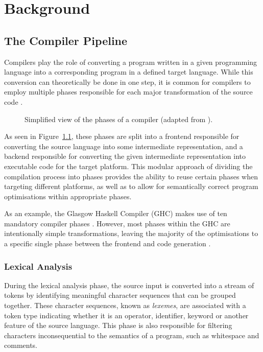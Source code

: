 \chapter{Background}
\label{ch:background}

\section{The Compiler Pipeline}

Compilers play the role of converting a program written in a given programming language into a
corresponding program in a defined target language. While this conversion can theoretically be done
in one step, it is common for compilers to employ multiple phases responsible for each major
transformation of the source code \autocite{grune2012modern}.

\begin{figure}
    \centering
    
    \caption{Simplified view of the phases of a compiler (adapted from \autocite{grune2012modern}).}
    \label{fig:compiler-pipeline}
\end{figure}

As seen in Figure~\ref{fig:compiler-pipeline}, these phases are split into a frontend responsible
for converting the source language into some intermediate representation, and a backend responsible
for converting the given intermediate representation into executable code for the target platform.
This modular approach of dividing the compilation process into phases provides the ability to reuse
certain phases when targeting different platforms, as well as to allow for semantically correct
program optimisations within appropriate phases.

As an example, the Glasgow Haskell Compiler (GHC) makes use of ten mandatory compiler phases
\autocite{ghccompiler}. However, most phases within the GHC are intentionally simple
transformations, leaving the majority of the optimisations to a specific single phase between the
frontend and code generation \autocite{jones1997transformation}.

\subsection{Lexical Analysis}

During the lexical analysis phase, the source input is converted into a stream of tokens by
identifying meaningful character sequences that can be grouped together. These character sequences,
known as \emph{lexemes}, are associated with a token type indicating whether it is an operator,
identifier, keyword or another feature of the source language. This phase is also responsible for
filtering characters inconsequential to the semantics of a program, such as whitespace and comments.

